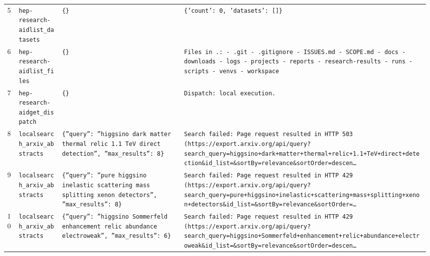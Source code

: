 \documentclass[11pt,a4paper]{article}
\begin{document}
\begin{longtable}{@{}p{}p{}p{}p{}@{}}
5 & \texttt{hep-research-aid}\newline\texttt{list\_\allowbreak{}datasets} & \texttt{\{\}\allowbreak{}} & \texttt{\{'count':\allowbreak{} 0,\allowbreak{} 'datasets':\allowbreak{} []\allowbreak{}\}\allowbreak{}} \\
6 & \texttt{hep-research-aid}\newline\texttt{list\_\allowbreak{}files} & \texttt{\{\}\allowbreak{}} & \texttt{Files in .:\allowbreak{}   - .git   - .gitignore   - ISSUES.md   - SCOPE.md   - docs   - downloads   - logs   - projects   - reports   - research-results   - runs   - scripts   - venvs   - workspace} \\
7 & \texttt{hep-research-aid}\newline\texttt{get\_\allowbreak{}dispatch} & \texttt{\{\}\allowbreak{}} & \texttt{Dispatch:\allowbreak{} local execution.} \\
8 & \texttt{local}\newline\texttt{search\_\allowbreak{}arxiv\_\allowbreak{}abstracts} & \texttt{\{''query'':\allowbreak{} ''higgsino dark matter thermal relic 1.1 TeV direct detection'',\allowbreak{} ''max\_\allowbreak{}results'':\allowbreak{} 8\}\allowbreak{}} & \texttt{Search failed:\allowbreak{} Page request resulted in HTTP 503 (https:\allowbreak{}/\allowbreak{}/\allowbreak{}export.arxiv.org/\allowbreak{}api/\allowbreak{}query?search\_\allowbreak{}query=\allowbreak{}higgsino+dark+matter+thermal+relic+1.1+TeV+direct+detection\&id\_\allowbreak{}list=\allowbreak{}\&sortBy=\allowbreak{}relevance\&sortOrder=\allowbreak{}descen\ldots{}\allowbreak{}} \\
9 & \texttt{local}\newline\texttt{search\_\allowbreak{}arxiv\_\allowbreak{}abstracts} & \texttt{\{''query'':\allowbreak{} ''pure higgsino inelastic scattering mass splitting xenon detectors'',\allowbreak{} ''max\_\allowbreak{}results'':\allowbreak{} 8\}\allowbreak{}} & \texttt{Search failed:\allowbreak{} Page request resulted in HTTP 429 (https:\allowbreak{}/\allowbreak{}/\allowbreak{}export.arxiv.org/\allowbreak{}api/\allowbreak{}query?search\_\allowbreak{}query=\allowbreak{}pure+higgsino+inelastic+scattering+mass+splitting+xenon+detectors\&id\_\allowbreak{}list=\allowbreak{}\&sortBy=\allowbreak{}relevance\&sortOrder=\allowbreak{}\ldots{}\allowbreak{}} \\
10 & \texttt{local}\newline\texttt{search\_\allowbreak{}arxiv\_\allowbreak{}abstracts} & \texttt{\{''query'':\allowbreak{} ''higgsino Sommerfeld enhancement relic abundance electroweak'',\allowbreak{} ''max\_\allowbreak{}results'':\allowbreak{} 6\}\allowbreak{}} & \texttt{Search failed:\allowbreak{} Page request resulted in HTTP 429 (https:\allowbreak{}/\allowbreak{}/\allowbreak{}export.arxiv.org/\allowbreak{}api/\allowbreak{}query?search\_\allowbreak{}query=\allowbreak{}higgsino+Sommerfeld+enhancement+relic+abundance+electroweak\&id\_\allowbreak{}list=\allowbreak{}\&sortBy=\allowbreak{}relevance\&sortOrder=\allowbreak{}descen\ldots{}\allowbreak{}} \\

\end{longtable}
\end{document}
